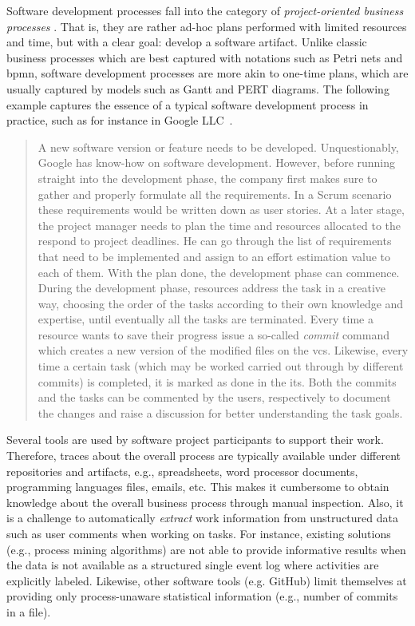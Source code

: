\documentclass[a4paper,11pt]{article}
\begin{document}
Software development processes fall into the category of \emph{project-oriented business processes} \cite{Bala2015}. 
That is, they are rather ad-hoc plans performed with limited resources and time, but with a clear goal: develop a software artifact. Unlike classic business processes which are best captured with notations such as Petri nets and \gls{bpmn}, software development processes are more akin to one-time plans, which are usually captured by models such as Gantt and PERT diagrams. The following example captures the essence of a typical software development process in practice, such as for instance in Google LLC~\cite{Henderson2017}.


\begin{quote}
A new software version or feature needs to be developed. Unquestionably, Google has know-how on software development. However, before running straight into the development phase, the company first makes sure to gather and properly formulate all the requirements. In a Scrum scenario these requirements would be written down as user stories. At a later stage, the project manager needs to plan the time and resources allocated to the respond to project deadlines. He can go through the list of requirements that need to be implemented and assign to an effort estimation value to each of them. With the plan done, the development phase can commence. During the development phase, resources address the task in a creative way, choosing the order of the tasks according to their own knowledge and expertise, until eventually all the tasks are terminated. Every time a resource wants to save their progress issue a so-called \emph{commit} command which creates a new version of the modified files on the \gls{vcs}. Likewise, every time a certain task (which may be worked carried out through by different commits) is completed, it is marked as done in the \gls{its}. Both the commits and the tasks can be commented by the users, respectively to document the changes and raise a discussion for better understanding the task goals.
\end{quote}

Several tools are used by software project participants to support their work. Therefore, traces about the overall process are typically available under different repositories and artifacts, e.g., spreadsheets, word processor documents, programming languages files, emails, etc. This makes it cumbersome to obtain knowledge about the overall business process through manual inspection. Also, it is a challenge to automatically \emph{extract} work information from unstructured data such as user comments when working on tasks. For instance, existing solutions (e.g., process mining algorithms) are not able to provide informative results when the data is not available as a structured single event log where activities are explicitly labeled. Likewise, other software tools (e.g. GitHub) limit themselves at providing only process-unaware statistical information (e.g., number of commits in a file).
\end{document}
